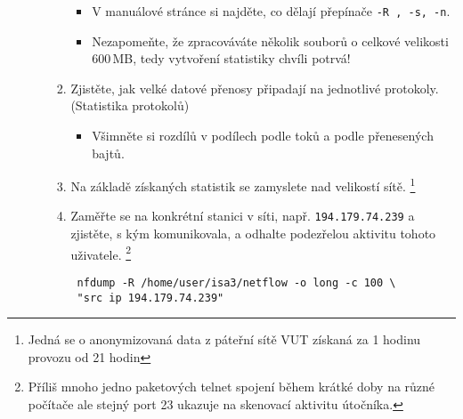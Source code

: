 \begin{itemize}
\begin{enumerate}
\begin{enumerate}
\begin{itemize}
                            \item V manuálové stránce si najděte, co dělají přepínače {\tt -R , -s, -n}.
                            \item Nezapomeňte, že zpracováváte několik souborů o celkové
              velikosti 600\,MB, tedy vytvoření statistiky chvíli potrvá!
                        \end{itemize}
                    \item Zjistěte, jak velké datové přenosy připadají na jednotlivé protokoly. (Statistika protokolů)
                        \begin{itemize}
                            \item Všimněte si rozdílů v podílech podle toků a podle přenesených bajtů.
                        \end{itemize}
                    \item Na základě získaných statistik se zamyslete nad velikostí sítě.
               \footnote{Jedná se o anonymizovaná data z páteřní sítě VUT
               získaná za 1 hodinu provozu od 21 hodin} 
                    \item Zaměřte se na konkrétní stanici v síti, např. {\tt 194.179.74.239} a
               zjistěte, s kým komunikovala, a odhalte podezřelou aktivitu tohoto uživatele.
               \footnote{Příliš mnoho jedno paketových telnet spojení během krátké doby na různé počítače ale stejný port 23 ukazuje na skenovací aktivitu útočníka.}
\begin{verbatim}
 nfdump -R /home/user/isa3/netflow -o long -c 100 \
 "src ip 194.179.74.239"
\end{verbatim} 


\end{enumerate}
\end{enumerate}
\end{itemize}
